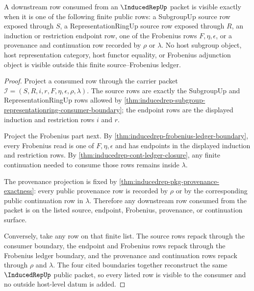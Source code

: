 \begin{theorem}
\label{thm:inducedrep-source-frobenius-exact-consumption}
A downstream row consumed from an $\InducedRepUp$ packet is visible exactly
when it is one of the following finite public rows: a SubgroupUp source row
exposed through $S$, a RepresentationRingUp source row exposed through $R$,
an induction or restriction endpoint row, one of the Frobenius rows
$F,\eta,\epsilon$, or a provenance and continuation row recorded by $\rho$ or
$\lambda$. No host subgroup object, host representation category, host
functor equality, or Frobenius adjunction object is visible outside this
finite source--Frobenius ledger.
\end{theorem}
\begin{proof}
Project a consumed row through the carrier packet
$\mathcal{I}=(S,R,i,r,F,\eta,\epsilon,\rho,\lambda)$. The source rows are
exactly the SubgroupUp and RepresentationRingUp rows allowed by
\autoref{thm:inducedrep-subgroup-representationring-consumer-boundary}; the
endpoint rows are the displayed induction and restriction rows $i$ and $r$.

Project the Frobenius part next. By
\autoref{thm:inducedrep-frobenius-ledger-boundary}, every Frobenius read is
one of $F,\eta,\epsilon$ and has endpoints in the displayed induction and
restriction rows. By \autoref{thm:inducedrep-cont-ledger-closure}, any finite
continuation needed to consume those rows remains inside $\lambda$.

The provenance projection is fixed by
\autoref{thm:inducedrep-pkg-provenance-exactness}: every public provenance
row is recorded by $\rho$ or by the corresponding public continuation row in
$\lambda$. Therefore any downstream row consumed from the packet is on the
listed source, endpoint, Frobenius, provenance, or continuation surface.

Conversely, take any row on that finite list. The source rows repack through
the consumer boundary, the endpoint and Frobenius rows repack through the
Frobenius ledger boundary, and the provenance and continuation rows repack
through $\rho$ and $\lambda$. The four cited boundaries together reconstruct
the same $\InducedRepUp$ public packet, so every listed row is visible to the
consumer and no outside host-level datum is added.
\end{proof}

